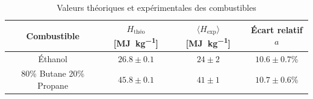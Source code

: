 \begin{table}[h]
    \centering
    \begin{tabulary}{\linewidth}{C C C C}
        \toprule
        Combustible & \(H_\textrm{théo}\) [\si{\mega\joule\per\kilo\gram}] & \(\langle H_\textrm{exp} \rangle\) [\si{\mega\joule\per\kilo\gram}] & Écart relatif \(a\) \\
        \midrule
        Éthanol & \(26.8 \pm 0.1\) & \(24 \pm 2\) & \(10.6 \pm 0.7\)\%\\
        80\% Butane 20\% Propane & \(45.8 \pm 0.1\) & \(41 \pm 1\) & \(10.7 \pm 0.6\)\% \\
        \bottomrule
    \end{tabulary}
    \caption{Valeurs théoriques et expérimentales des combustibles}
    \label{tab:pouvoir_calorifique}
\end{table}
